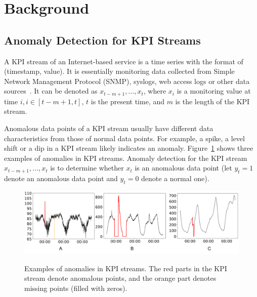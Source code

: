 \section{Background}
\label{sec:background-and-challenges}

\subsection{Anomaly Detection for KPI Streams}
\label{subsec:problem}
A KPI stream of an Internet-based service is a time series with the format of (timestamp, value). It is essentially monitoring data collected from Simple Network Management Protocol (SNMP), syslogs, web access logs or other data sources~\cite{meng2018device,zhang2018prefix,zhang2017syslog}. 
It can be denoted as $x_{t-m+1}, \dots, x_t$, where $x_i$ is a monitoring value at time $i, i\in[t-m+1, t]$, $t$ is the present time, and $m$ is the length of the KPI stream.

Anomalous data points of a KPI stream usually have different data characteristics from those of normal data points.
For example, a spike, a level shift or a dip in a KPI stream likely indicates an anomaly.
Figure~\ref{fig:anomaly} shows three examples of anomalies in KPI streams.
Anomaly detection for the KPI stream $x_{t-m+1}, \dots, x_t$ is to determine whether $x_t$ is an anomalous data point (let $y_t=1$ denote an anomalous data point and $y_t=0$ denote a normal one). 

\begin{figure}
\setlength{\abovecaptionskip}{-0.1cm}
      \begin{minipage}[h]{1.0\linewidth}
      \centering
      \includegraphics[width=1\textwidth]{fig/anomaly.pdf}\\
      \end{minipage}
      \caption{Examples of anomalies in KPI streams. 
      The red parts in the KPI stream denote anomalous points, and the orange part denotes missing points (filled with zeros).
      }
      \label{fig:anomaly}
      \vspace{-6 mm}
\end{figure}


